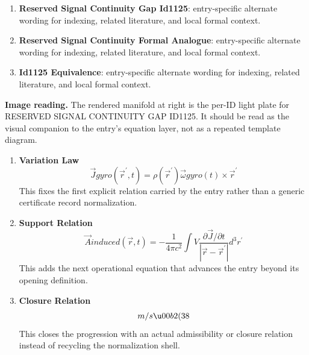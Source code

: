 \begin{enumerate}[leftmargin=1.6em,itemsep=6pt,topsep=4pt]
\item \textbf{Reserved Signal Continuity Gap Id1125}: entry-specific alternate wording for indexing, related literature, and local formal context.
\item \textbf{Reserved Signal Continuity Formal Analogue}: entry-specific alternate wording for indexing, related literature, and local formal context.
\item \textbf{Id1125 Equivalence}: entry-specific alternate wording for indexing, related literature, and local formal context.
\end{enumerate}

\begin{samepage}
\noindent\begin{minipage}[t]{0.45\linewidth}
\vspace{0pt}
\raggedright
\scriptsize\textbf{Image reading.} The rendered manifold at right is the per-ID light plate for RESERVED SIGNAL CONTINUITY GAP ID1125. It should be read as the visual companion to the entry's equation layer, not as a repeated template diagram.\par
\end{minipage}\hfill
\begin{minipage}[t]{0.53\linewidth}
\vspace*{-0.10in}
\raggedright
{}
\end{minipage}
\end{samepage}

\clearpage


\begin{enumerate}[leftmargin=1.6em,itemsep=9pt,topsep=6pt]
\item \textbf{Variation Law}
\[
\vec{J} {gyro}(\vec{r}^{\prime},t) = \rho(\vec{r}^{\prime})\vec{\omega} {gyro}(t)\times\vec{r}^{\prime}
\]
This fixes the first explicit relation carried by the entry rather than a generic certificate record normalization.

\item \textbf{Support Relation}
\[
\vec{A} {induced}(\vec{r},t) = -\frac{1}{4\pi c^{2}}\int {V}\frac{\partial\vec{J}/\partial t}{|\vec{r}-\vec{r}^{\prime}|}d^{3}r^{\prime}
\]
This adds the next operational equation that advances the entry beyond its opening definition.

\item \textbf{Closure Relation}
\[
m/s\u00b2 (38%
\]
This closes the progression with an actual admissibility or closure relation instead of recycling the normalization shell.
\end{enumerate}

